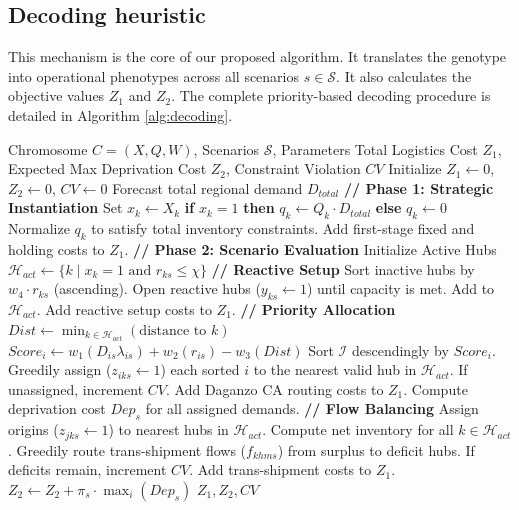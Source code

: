 \documentclass{llncs}
\begin{document}
{\subsection{Decoding heuristic}

This mechanism is the core of our proposed algorithm. It translates the genotype into operational phenotypes across all scenarios $s \in \mathcal{S}$. It also calculates the objective values $Z_1$ and $Z_2$. The complete priority-based decoding procedure is detailed in Algorithm \ref{alg:decoding}.



\begin{algorithm}[htbp]
\caption{Two-Stage Priority-Based Decoding Heuristic}
\label{alg:decoding}
\begin{algorithmic}[1]
\REQUIRE Chromosome $C = (X, Q, W)$, Scenarios $\mathcal{S}$, Parameters
\ENSURE Total Logistics Cost $Z_1$, Expected Max Deprivation Cost $Z_2$, Constraint Violation $CV$
\STATE Initialize $Z_1 \leftarrow 0$, $Z_2 \leftarrow 0$, $CV \leftarrow 0$
\STATE Forecast total regional demand $D_{total}$
\STATE \textbf{// Phase 1: Strategic Instantiation}
    \STATE Set $x_k \leftarrow X_k$
    \STATE \textbf{if} $x_k = 1$ \textbf{then} $q_k \leftarrow Q_k \cdot D_{total}$ \textbf{else} $q_k \leftarrow 0$
\ENDFOR
\STATE Normalize $q_k$ to satisfy total inventory constraints.
\STATE Add first-stage fixed and holding costs to $Z_1$.
\STATE \textbf{// Phase 2: Scenario Evaluation}
    \STATE Initialize Active Hubs $\mathcal{H}_{act} \leftarrow \{k \mid x_k = 1 \text{ and } r_{ks} \le \chi \}$
    \STATE \textbf{// Reactive Setup}
        \STATE Sort inactive hubs by $w_4 \cdot r_{ks}$ (ascending).
        \STATE Open reactive hubs ($y_{ks} \leftarrow 1$) until capacity is met. Add to $\mathcal{H}_{act}$.
    \ENDIF
    \STATE Add reactive setup costs to $Z_1$.
    \STATE \textbf{// Priority Allocation}
        \STATE $Dist \leftarrow \min_{k \in \mathcal{H}_{act}} (\text{distance to } k)$
        \STATE $Score_i \leftarrow w_1(D_{is}\lambda_{is}) + w_2(r_{is}) - w_3(Dist)$
    \ENDFOR
    \STATE Sort $\mathcal{I}$ descendingly by $Score_i$.
    \STATE Greedily assign ($z_{iks} \leftarrow 1$) each sorted $i$ to the nearest valid hub in $\mathcal{H}_{act}$.
    \STATE If unassigned, increment $CV$. Add Daganzo CA routing costs to $Z_1$.
    \STATE Compute deprivation cost $Dep_s$ for all assigned demands.
    \STATE \textbf{// Flow Balancing}
    \STATE Assign origins ($z_{jks} \leftarrow 1$) to nearest hubs in $\mathcal{H}_{act}$.
    \STATE Compute net inventory for all $k \in \mathcal{H}_{act}$.
    \STATE Greedily route trans-shipment flows ($f_{khms}$) from surplus to deficit hubs.
    \STATE If deficits remain, increment $CV$. Add trans-shipment costs to $Z_1$.
    \STATE $Z_2 \leftarrow Z_2 + \pi_s \cdot \max_i (Dep_s)$
\ENDFOR
\RETURN $Z_1, Z_2, CV$
\end{algorithmic}
\end{algorithm}

}
\end{document}
